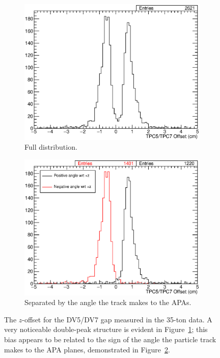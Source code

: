\begin{figure}
  \centering
  \begin{subfigure}[t]{\linewidth}
    \centering
    \includegraphics[width=12cm]{TPC5TPC7Gap.eps}
    \caption{Full distribution.}
    \label{fig:DV5DV7Gap}
  \end{subfigure}
  \hfill
  \begin{subfigure}[t]{\linewidth}
    \centering
    \includegraphics[width=12cm]{TPC5TPC7GapAngle.eps}
    \caption{Separated by the angle the track makes to the APAs.}
    \label{fig:DV5DV7GapAngle}
  \end{subfigure}
  \caption[The $z$-offset for the DV5/DV7 gap measured in the 35-ton data.]{The $z$-offset for the DV5/DV7 gap measured in the 35-ton data.  A very noticeable double-peak structure is evident in Figure~\ref{fig:DV5DV7Gap}; this bias appears to be related to the sign of the angle the particle track makes to the APA planes, demonstrated in Figure~\ref{fig:DV5DV7GapAngle}.}
  \label{fig:DV5DV7XOffsetZOffset}
\end{figure}

